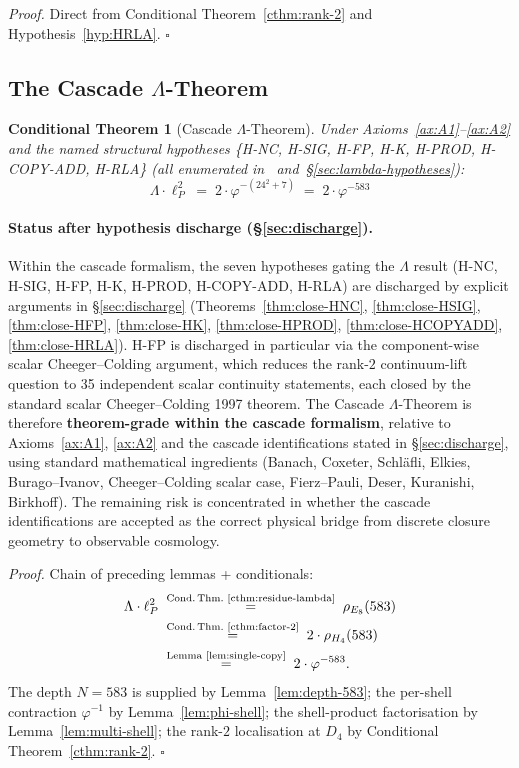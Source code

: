 \documentclass[11pt]{article}
\theoremstyle{plain}
\newtheorem{conditional}[theorem]{Conditional Theorem}
\theoremstyle{definition}
\theoremstyle{remark}
\begin{document}
\noindent\emph{Proof.} Direct from Conditional Theorem~\ref{cthm:rank-2} and Hypothesis~\ref{hyp:HRLA}. \hfill$\square$

\subsection{The Cascade $\Lambda$-Theorem}\label{sec:lambda-theorem}

\begin{conditional}[Cascade $\Lambda$-Theorem]\label{cthm:lambda}
Under Axioms~\ref{ax:A1}--\ref{ax:A2} and the named structural hypotheses \{H-NC, H-SIG, H-FP, H-K, H-PROD, H-COPY-ADD, H-RLA\} (all enumerated in~\citealp{SmartXXXVI} and~\S\ref{sec:lambda-hypotheses}):
\[
  \boxed{\;\Lambda \cdot \ell_P^2 \;=\; 2 \cdot \varphi^{-(24^2 + 7)} \;=\; 2 \cdot \varphi^{-583}\;}
\]
\end{conditional}

\paragraph{Status after hypothesis discharge (\S\ref{sec:discharge}).} Within the cascade formalism, the seven hypotheses gating the $\Lambda$ result (H-NC, H-SIG, H-FP, H-K, H-PROD, H-COPY-ADD, H-RLA) are discharged by explicit arguments in \S\ref{sec:discharge} (Theorems~\ref{thm:close-HNC}, \ref{thm:close-HSIG}, \ref{thm:close-HFP}, \ref{thm:close-HK}, \ref{thm:close-HPROD}, \ref{thm:close-HCOPYADD}, \ref{thm:close-HRLA}). H-FP is discharged in particular via the component-wise scalar Cheeger--Colding argument, which reduces the rank-$2$ continuum-lift question to 35 independent scalar continuity statements, each closed by the standard scalar Cheeger--Colding 1997 theorem. The Cascade $\Lambda$-Theorem is therefore \textbf{theorem-grade within the cascade formalism}, relative to Axioms~\ref{ax:A1}, \ref{ax:A2} and the cascade identifications stated in \S\ref{sec:discharge}, using standard mathematical ingredients (Banach, Coxeter, Schl\"afli, Elkies, Burago--Ivanov, Cheeger--Colding scalar case, Fierz--Pauli, Deser, Kuranishi, Birkhoff). The remaining risk is concentrated in whether the cascade identifications are accepted as the correct physical bridge from discrete closure geometry to observable cosmology.

\noindent\emph{Proof.} Chain of preceding lemmas + conditionals:
\begin{align*}
  \Lambda \cdot \ell_P^2 \;&\stackrel{\text{Cond.\,Thm.~\ref{cthm:residue-lambda}}}{=}\; \rho_{E_8}(583) \\
  \;&\stackrel{\text{Cond.\,Thm.~\ref{cthm:factor-2}}}{=}\; 2 \cdot \rho_{H_4}(583) \\
  \;&\stackrel{\text{Lemma~\ref{lem:single-copy}}}{=}\; 2 \cdot \varphi^{-583}.
\end{align*}
The depth $N = 583$ is supplied by Lemma~\ref{lem:depth-583}; the per-shell contraction $\varphi^{-1}$ by Lemma~\ref{lem:phi-shell}; the shell-product factorisation by Lemma~\ref{lem:multi-shell}; the rank-$2$ localisation at $D_4$ by Conditional Theorem~\ref{cthm:rank-2}. \hfill$\square$
\end{document}
